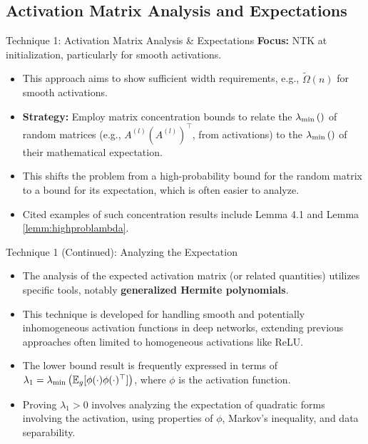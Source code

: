 \documentclass{beamer}
\newcommand{\E}{\mathbb{E}} %
\newcommand{\evmin}[1]{\lambda_{\rm min}\left(#1\right)} %
\begin{document}
\subsection{Activation Matrix Analysis and Expectations}
\begin{frame}{Technique 1: Activation Matrix Analysis & Expectations}
  \textbf{Focus:} NTK at initialization, particularly for smooth activations.
  \begin{itemize}[<+->]
    \item This approach aims to show sufficient width requirements, e.g., $\tilde{\Omega}(n)$ for smooth activations.
    \item \textbf{Strategy:} Employ matrix concentration bounds to relate the $\evmin{}$ of random matrices (e.g., $A^{(l)}(A^{(l)})^\top$, from activations) to the $\evmin{}$ of their mathematical expectation.
    \item This shifts the problem from a high-probability bound for the random matrix to a bound for its expectation, which is often easier to analyze.
    \item Cited examples of such concentration results include Lemma 4.1 and Lemma \ref{lemm:highproblambda}.
  \end{itemize}
\end{frame}

\begin{frame}{Technique 1 (Continued): Analyzing the Expectation}
  \begin{itemize}[<+->]
    \item The analysis of the expected activation matrix (or related quantities) utilizes specific tools, notably \textbf{generalized Hermite polynomials}.
    \item This technique is developed for handling smooth and potentially inhomogeneous activation functions in deep networks, extending previous approaches often limited to homogeneous activations like ReLU.
    \item The lower bound result is frequently expressed in terms of $\lambda_1 = \evmin{\E_g[\phi(\cdot)\phi(\cdot)^\top]}$, where $\phi$ is the activation function.
    \item Proving $\lambda_1 > 0$ involves analyzing the expectation of quadratic forms involving the activation, using properties of $\phi$, Markov's inequality, and data separability.
  \end{itemize}
\end{frame}
\end{document}
